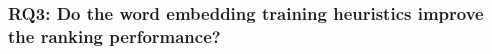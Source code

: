 

\subsubsection{\textbf{RQ3:} Do the word embedding training heuristics improve the ranking performance?}
\label{sec:evaluation:rq4}


